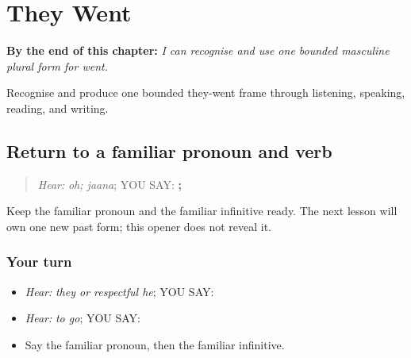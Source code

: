 
\chapter{They Went}
\label{ch:pa-a2-gae}

\begin{chapteropening}
\textbf{By the end of this chapter:} \emph{I can recognise and use one bounded masculine plural form for went.}

Recognise and produce one bounded they-went frame through listening, speaking, reading, and writing.
\end{chapteropening}

\section[\texorpdfstring{\pa{ਉਹ} · \pa{ਜਾਣਾ} (oh; jaana)}{ਉਹ · ਜਾਣਾ (oh; jaana)}]{Return to a familiar pronoun and verb}

\label{lesson:PA-C206-go-return}



\begin{quote}
\emph{Hear:} \emph{oh; jaana}; YOU SAY: \textbf{; }
\end{quote}

\begin{grammarlens}[title={Grammar Lens}]
Keep the familiar pronoun and the familiar infinitive ready. The next lesson will own one new past form; this opener does not reveal it.
\end{grammarlens}

\subsection*{Your turn}
\begin{itemize}
\raggedright
  \item \emph{Hear:} \emph{they or respectful he}; YOU SAY: \textbf{}
  \item \emph{Hear:} \emph{to go}; YOU SAY: \textbf{}
  \item Say the familiar pronoun, then the familiar infinitive.
\end{itemize}

